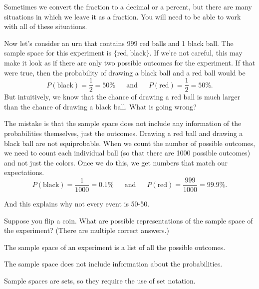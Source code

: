 \documentclass{ximera}
\begin{document}
Sometimes we convert the fraction to a decimal or a percent, but there are many situations in which we leave it as a fraction. You will need to be able to work with all of these situations.

Now let's consider an urn that contains 999 red balls and 1 black ball. The sample space for this experiment is $\{ \text{red}, \text{black} \}$. If we're not careful, this may make it look as if there are only two possible outcomes for the experiment. If that were true, then the probability of drawing a black ball and a red ball would be
\[ P(\text{black}) = \dfrac{1}{2} = 50\% \hspace{15pt} \text{ and } \hspace{15pt} P(\text{red}) = \dfrac{1}{2} = 50\%. \]
But intuitively, we know that the chance of drawing a red ball is much larger than the chance of drawing a black ball. What is going wrong?

The mistake is that the sample space does not include any information of the probabilities themselves, just the outcomes. Drawing a red ball and drawing a black ball are not equiprobable. When we count the number of possible outcomes, we need to count each individual ball (so that there are 1000 possible outcomes) and not just the colors. Once we do this, we get numbers that match our expectations.
\[ P(\text{black}) = \dfrac{1}{1000} = 0.1\% \hspace{15pt} \text{ and } \hspace{15pt} P(\text{red}) = \dfrac{999}{1000} = 99.9\%. \]

And this explains why not every event is 50-50.


\begin{question}
Suppose you flip a coin. What are possible representations of the sample space of the experiment? (There are multiple correct answers.)
  \begin{solution}
    \begin{multiple-choice}
      \end{multiple-choice}
    \begin{hint}
    The sample space of an experiment is a list of all the possible outcomes.
    \end{hint}
    \begin{hint}
    The sample space does not include information about the probabilities.
    \end{hint}
    \begin{hint}
    Sample spaces are sets, so they require the use of set notation.
    \end{hint}
  \end{solution}
\end{question}
\end{document}
